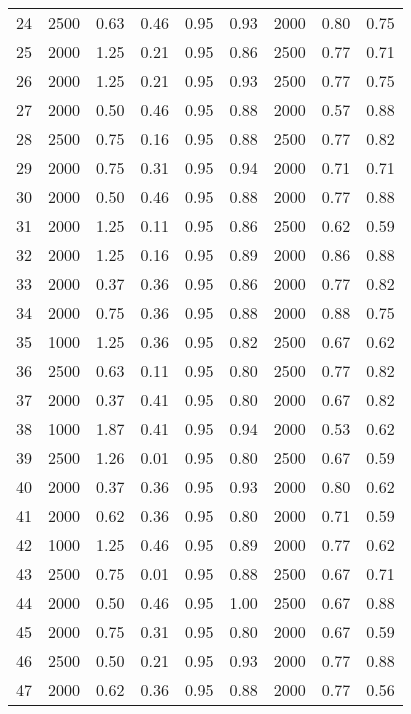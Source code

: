 \begin{longtable}[c]{ccccccccc}
24  &  2500 &  0.63 &  0.46 &  0.95 &  0.93 &  2000 &  0.80 &  0.75 \\
25  &  2000 &  1.25 &  0.21 &  0.95 &  0.86 &  2500 &  0.77 &  0.71 \\
26  &  2000 &  1.25 &  0.21 &  0.95 &  0.93 &  2500 &  0.77 &  0.75 \\
27  &  2000 &  0.50 &  0.46 &  0.95 &  0.88 &  2000 &  0.57 &  0.88 \\
28  &  2500 &  0.75 &  0.16 &  0.95 &  0.88 &  2500 &  0.77 &  0.82 \\
29  &  2000 &  0.75 &  0.31 &  0.95 &  0.94 &  2000 &  0.71 &  0.71 \\
30  &  2000 &  0.50 &  0.46 &  0.95 &  0.88 &  2000 &  0.77 &  0.88 \\
31  &  2000 &  1.25 &  0.11 &  0.95 &  0.86 &  2500 &  0.62 &  0.59 \\
32  &  2000 &  1.25 &  0.16 &  0.95 &  0.89 &  2000 &  0.86 &  0.88 \\
33  &  2000 &  0.37 &  0.36 &  0.95 &  0.86 &  2000 &  0.77 &  0.82 \\
34  &  2000 &  0.75 &  0.36 &  0.95 &  0.88 &  2000 &  0.88 &  0.75 \\
35  &  1000 &  1.25 &  0.36 &  0.95 &  0.82 &  2500 &  0.67 &  0.62 \\
36  &  2500 &  0.63 &  0.11 &  0.95 &  0.80 &  2500 &  0.77 &  0.82 \\
37  &  2000 &  0.37 &  0.41 &  0.95 &  0.80 &  2000 &  0.67 &  0.82 \\
38  &  1000 &  1.87 &  0.41 &  0.95 &  0.94 &  2000 &  0.53 &  0.62 \\
39  &  2500 &  1.26 &  0.01 &  0.95 &  0.80 &  2500 &  0.67 &  0.59 \\
40  &  2000 &  0.37 &  0.36 &  0.95 &  0.93 &  2000 &  0.80 &  0.62 \\
41  &  2000 &  0.62 &  0.36 &  0.95 &  0.80 &  2000 &  0.71 &  0.59 \\
42  &  1000 &  1.25 &  0.46 &  0.95 &  0.89 &  2000 &  0.77 &  0.62 \\
43  &  2500 &  0.75 &  0.01 &  0.95 &  0.88 &  2500 &  0.67 &  0.71 \\
44  &  2000 &  0.50 &  0.46 &  0.95 &  1.00 &  2500 &  0.67 &  0.88 \\
45  &  2000 &  0.75 &  0.31 &  0.95 &  0.80 &  2000 &  0.67 &  0.59 \\
46  &  2500 &  0.50 &  0.21 &  0.95 &  0.93 &  2000 &  0.77 &  0.88 \\
47  &  2000 &  0.62 &  0.36 &  0.95 &  0.88 &  2000 &  0.77 &  0.56 \\

\end{longtable}
